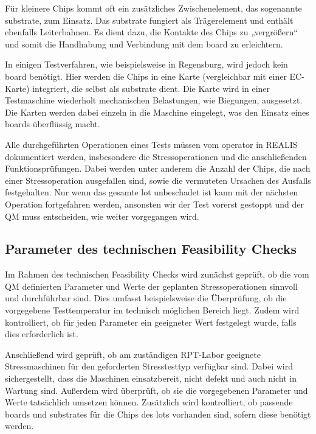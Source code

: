 Für kleinere Chips kommt oft ein zusätzliches Zwischenelement, das sogenannte \gls{substrate}, zum Einsatz. Das \gls{substrate} fungiert als Trägerelement und enthält ebenfalls Leiterbahnen. Es dient dazu, die Kontakte des Chips zu „vergrößern“ und somit die Handhabung und Verbindung mit dem \gls{board} zu erleichtern.

In einigen Testverfahren, wie beispielsweise in Regensburg, wird jedoch kein \gls{board} benötigt. Hier werden die Chips in eine Karte (vergleichbar mit einer EC-Karte) integriert, die selbst als \gls{substrate} dient. Die Karte wird in einer Testmaschine wiederholt mechanischen Belastungen, wie Biegungen, ausgesetzt. Die Karten werden dabei einzeln in die Maschine eingelegt, was den Einsatz eines \glspl{board} überflüssig macht.

Alle durchgeführten Operationen eines Tests müssen vom \gls{operator} in \gls{REALIS} dokumentiert werden, insbesondere die Stressoperationen und die anschließenden Funktionsprüfungen. Dabei werden unter anderem die Anzahl der Chips, die nach einer Stressoperation ausgefallen sind, sowie die vermuteten Ursachen des Ausfalls festgehalten.
Nur wenn das gesamte \gls{lot} unbeschadet ist kann mit der nächsten Operation fortgefahren werden, ansonsten wir der Test vorerst gestoppt und der \gls{QM} muss entscheiden, wie weiter vorgegangen wird.

\subsection{Parameter des technischen Feasibility Checks}\label{Subsec:ParameterdestechnischenFeasibilityChecks}

Im Rahmen des technischen Feasibility Checks wird zunächst geprüft, ob die vom \gls{QM} definierten Parameter und Werte der geplanten Stressoperationen sinnvoll und durchführbar sind. Dies umfasst beispielsweise die Überprüfung, ob die vorgegebene Testtemperatur im technisch möglichen Bereich liegt. Zudem wird kontrolliert, ob für jeden Parameter ein geeigneter Wert festgelegt wurde, falls dies erforderlich ist.

Anschließend wird geprüft, ob am zuständigen \gls{RPT}-Labor geeignete Stressmaschinen für den geforderten Stresstesttyp verfügbar sind. Dabei wird sichergestellt, dass die Maschinen einsatzbereit, nicht defekt und auch nicht in Wartung sind. Außerdem wird überprüft, ob sie die vorgegebenen Parameter und Werte tatsächlich umsetzen können. Zusätzlich wird kontrolliert, ob passende \glspl{board} und \glspl{substrate} für die Chips des \glspl{lot} vorhanden sind, sofern diese benötigt werden.


